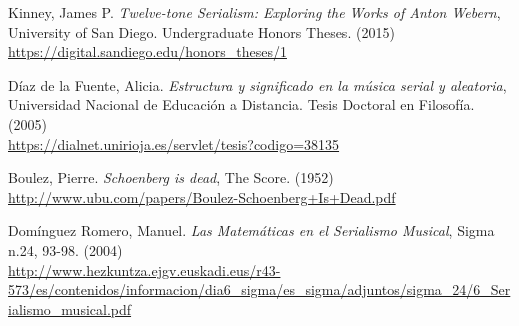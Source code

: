 \renewcommand\refname{Referencias}
	\begin{thebibliography}{00}
			
			
			
			{ Kinney, James P.} 
			\textit{Twelve-tone Serialism: Exploring the Works of Anton Webern},
			University of San Diego.
			Undergraduate Honors Theses.
			(2015)
			\\\url{https://digital.sandiego.edu/honors_theses/1}
			
			{ D\'iaz de la Fuente, Alicia.} 
			\textit{Estructura y significado en la m\'usica serial y aleatoria},
			Universidad Nacional de Educaci\'on a Distancia.
			Tesis Doctoral en Filosof\'ia.
			(2005)
			\\\url{https://dialnet.unirioja.es/servlet/tesis?codigo=38135}		
			
			
			
			{ Boulez, Pierre.}
			\textit{Schoenberg is dead},
			The Score.
			(1952)
			\\\url{http://www.ubu.com/papers/Boulez-Schoenberg+Is+Dead.pdf}
			
			{ Dom\'inguez Romero, Manuel.} 
			\textit{Las Matem\'aticas en el Serialismo Musical},
			Sigma n.24, 93-98.
			(2004)
			\\\url{http://www.hezkuntza.ejgv.euskadi.eus/r43-573/es/contenidos/informacion/dia6_sigma/es_sigma/adjuntos/sigma_24/6_Serialismo_musical.pdf}

			

\end{thebibliography}
